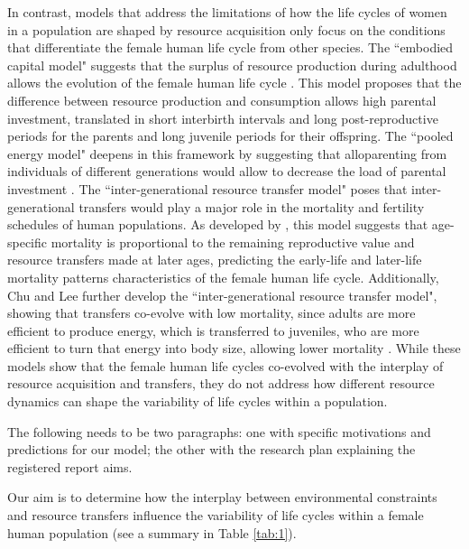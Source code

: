 \documentclass{article}
\begin{document}
In contrast, models that address the limitations of how the life cycles of women in a population are shaped by resource acquisition only focus on the conditions that differentiate the female human life cycle from other species. The ``embodied capital model" suggests that the surplus of resource production during adulthood allows the evolution of the female human life cycle \citep{kaplan2000theory}. This model proposes that the difference between resource production and consumption allows high parental investment, translated in short interbirth intervals and long post-reproductive periods for the parents and long juvenile periods for their offspring. The ``pooled energy model" deepens in this framework by suggesting that alloparenting from individuals of different generations would allow to decrease the load of parental investment \citep{kramer2010pooled}. The ``inter-generational resource transfer model" poses that inter-generational transfers would play a major role in the mortality and fertility schedules of human populations. As developed by \cite{lee2003rethinking}, this model suggests that age-specific mortality is proportional to the remaining reproductive value and resource transfers made at later ages, predicting the early-life and later-life mortality patterns characteristics of the female human life cycle. Additionally, Chu and Lee further develop the ``inter-generational resource transfer model", showing that transfers co-evolve with low mortality, since adults are more efficient to produce energy, which is transferred to juveniles, who are more efficient to turn that energy into body size, allowing lower mortality \citep{chu2006co}. While these models show that the female human life cycles co-evolved with the interplay of resource acquisition and transfers, they do not address how different resource dynamics can shape the variability of life cycles within a population.

The following needs to be two paragraphs: one with specific motivations and predictions for our model; the other with the research plan explaining the registered report aims.

Our aim is to determine how the interplay between environmental constraints and resource transfers influence the variability of life cycles within a female human population (see a summary in Table \ref{tab:1}). 
\end{document}
